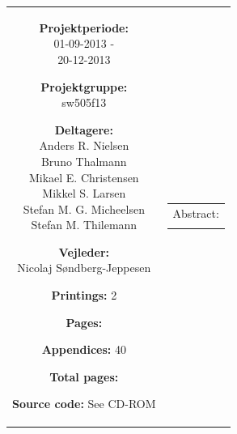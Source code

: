 \begin{titlepage}
\begin{nopagebreak}
{\begin{tabular}{cc}
{	\parbox{8cm}{
	\begin{description}
		\item { \textbf{Projektperiode:}}\\
			01-09-2013 -\\
			20-12-2013
 		\hspace{4cm}
		\item { \textbf{Projektgruppe:}}\\
  			sw505f13
 		\hspace{4cm}
		\item {\textbf{Deltagere:}}\\
			Anders R. Nielsen\\
			Bruno Thalmann\\
			Mikael E. Christensen\\
			Mikkel S. Larsen\\
			Stefan M. G. Micheelsen\\
			Stefan M. Thilemann\\
		\hspace{2cm}
		\item { \textbf{Vejleder:}}\\
 			Nicolaj Søndberg-Jeppesen\\
  	\end{description}
	}
	\begin{description}
		\item { \textbf{Printings:} 2}
		\item { \textbf{Pages:} \pageref{LastPageBody} } 
		\item { \textbf{Appendices:} 40}
		\item { \textbf{Total pages:} \pageref{LastPage} }
		\item { \textbf{Source code:} See CD-ROM}
	\end{description}
	\vfill } &
	\parbox{6.5cm}{
 	 \vspace{.15cm}
  	\hfill 
  	\begin{tabular}{l}
  		{Abstract:}\bigskip \\
  		\fbox{
  		\parbox{6cm}{\bigskip
     		{\vfill{\small 
     		\bigskip}}
     	}}
   	\end{tabular}}
\end{tabular}
}%
\end{nopagebreak}
\end{titlepage}
